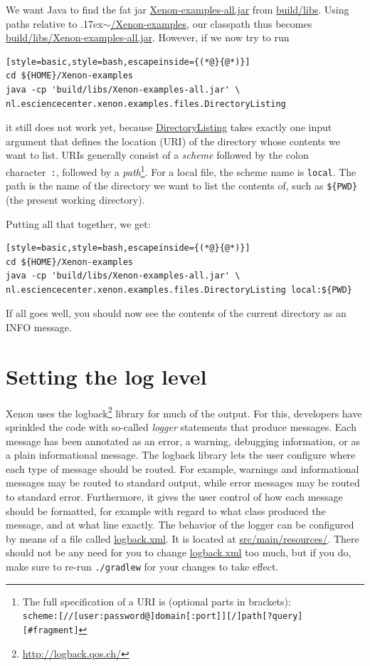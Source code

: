 \documentclass[12pt, a4paper, twoside, openany, titlepage]{book}
\newcommand{\mytilde}{\raise.17ex\hbox{$\scriptstyle\sim$}}
\begin{document}
We want Java to find the fat jar \url{Xenon-examples-all.jar} from \url{build/libs}. Using paths relative to \mytilde\url{/Xenon-examples}, our classpath thus becomes \url{build/libs/Xenon-examples-all.jar}. However, if we now try to run
\begin{lstlisting}[style=basic,style=bash,escapeinside={(*@}{@*)}]
cd ${HOME}/Xenon-examples
java -cp 'build/libs/Xenon-examples-all.jar' \
nl.esciencecenter.xenon.examples.files.DirectoryListing
\end{lstlisting}
it still does not work yet, because \url{DirectoryListing} takes exactly one input argument that defines the location (URI) of the directory whose contents we want to list. URIs generally consist of a \textit{scheme} followed by the colon character~\texttt{:}, followed by a \textit{path}\footnote{The full specification of a URI is (optional parts in brackets): \\ \texttt{scheme:[//[user:password@]domain[:port]][/]path[?query][#fragment]}\label{footnote:format-uri}}. For a local file, the scheme name is \texttt{local}. The path is the name of the directory we want to list the contents of, such as \texttt{\$\{PWD\}} (the present working directory).

Putting all that together, we get:

\begin{lstlisting}[style=basic,style=bash,escapeinside={(*@}{@*)}]
cd ${HOME}/Xenon-examples
java -cp 'build/libs/Xenon-examples-all.jar' \
nl.esciencecenter.xenon.examples.files.DirectoryListing local:${PWD}
\end{lstlisting} \label{snip:directory-listing-local}

If all goes well, you should now see the contents of the current directory as an INFO message.


\section{Setting the log level}
\label{sec:setting-the-log-level-command-line}

Xenon uses the logback\footnote{\url{http://logback.qos.ch/}} library for much of the output. For this, developers have sprinkled the code with so-called \textit{logger} statements that produce messages. Each message has been annotated as an error, a warning, debugging information, or as a plain informational message. The logback library lets the user configure where each type of message should be routed. For example, warnings and informational messages may be routed to standard output, while error messages may be routed to standard error. Furthermore, it gives the user control of how each message should be formatted, for example with regard to what class produced the message, and at what line exactly. The behavior of the logger can be configured by means of a file called \url{logback.xml}. It is located at \url{src/main/resources/}. There should not be any need for you to change \url{logback.xml} too much, but if you do, make sure to re-run \texttt{./gradlew} for your changes to take effect.
\end{document}
